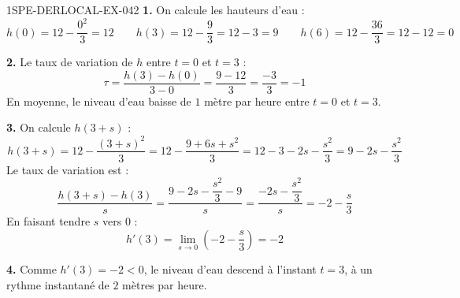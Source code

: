 \begin{corrige}{1SPE-DERLOCAL-EX-042}
\textbf{1.} On calcule les hauteurs d'eau :
\[
h(0) = 12 - \frac{0^2}{3} = 12 \qquad h(3) = 12 - \frac{9}{3} = 12 - 3 = 9 \qquad h(6) = 12 - \frac{36}{3} = 12 - 12 = 0
\]

\textbf{2.} Le taux de variation de $h$ entre $t = 0$ et $t = 3$ :
\[
\tau = \frac{h(3) - h(0)}{3 - 0} = \frac{9 - 12}{3} = \frac{-3}{3} = -1
\]
En moyenne, le niveau d'eau baisse de $1$ mètre par heure entre $t = 0$ et $t = 3$.

\textbf{3.} On calcule $h(3 + s)$ :
\[
h(3+s) = 12 - \frac{(3+s)^2}{3} = 12 - \frac{9 + 6s + s^2}{3} = 12 - 3 - 2s - \frac{s^2}{3} = 9 - 2s - \frac{s^2}{3}
\]
Le taux de variation est :
\[
\frac{h(3+s) - h(3)}{s} = \frac{9 - 2s - \dfrac{s^2}{3} - 9}{s} = \frac{-2s - \dfrac{s^2}{3}}{s} = -2 - \frac{s}{3}
\]
En faisant tendre $s$ vers $0$ :
\[
h'(3) = \lim_{s \to 0} \left(-2 - \frac{s}{3}\right) = -2
\]

\textbf{4.} Comme $h'(3) = \boxed{-2} < 0$, le niveau d'eau descend à l'instant $t = 3$, à un rythme instantané de $2$ mètres par heure.
\end{corrige}

